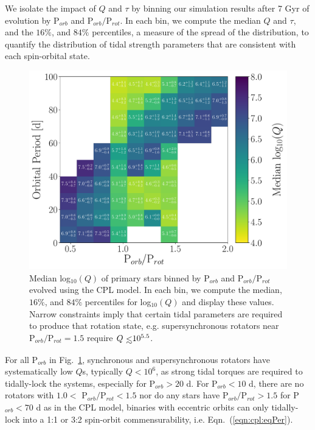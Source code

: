 \documentclass[twocolumn]{aastex61}
\def\lsim{~\rlap{$<$}{\lower 1.0ex\hbox{$\sim$}}}
\begin{document}
We isolate the impact of $Q$ and $\tau$ by binning our simulation results after 7 Gyr of evolution by P$_{orb}$ and P$_{orb}/$P$_{rot}$.  In each bin, we compute the median $Q$ and $\tau$, and the $16\%$, and $84\%$ percentiles, a measure of the spread of the distribution, to quantify the distribution of tidal strength parameters that are consistent with each spin-orbital state.  

\begin{figure}
	\includegraphics[width=\textwidth]{../Plots/porbProtPorbQHist.pdf}
   \caption{Median log$_{10}(Q)$ of primary stars binned by P$_{orb}$ and P$_{orb}/$P$_{rot}$ evolved using the CPL model.  In each bin, we compute the median, $16\%$, and $84\%$ percentiles for log$_{10}(Q)$ and display these values. Narrow constraints imply that certain tidal parameters are required to produce that rotation state, e.g. supersynchronous rotators near P$_{orb}/$P$_{rot} = 1.5$ require $Q \lsim 10^{5.5}$. }%
    \label{fig:qmap}%
\end{figure}

For all P$_{orb}$ in Fig.~\ref{fig:qmap}, synchronous and supersynchronous rotators have systematically low $Q$s, typically $Q < 10^6$, as strong tidal torques are required to tidally-lock the systems, especially for P$_{orb} > 20$ d. For P$_{orb} < 10$ d, there are no rotators with $1.0 <$ P$_{orb}/$P$_{rot} < 1.5$ nor do any stars have P$_{orb}/$P$_{rot} > 1.5$ for P$_{orb} < 70$ d as in the CPL model, binaries with eccentric orbits can only tidally-lock into a 1:1 or 3:2 spin-orbit commensurability, i.e. Eqn.~(\ref{eqn:cpl:eqPer}).   
\end{document}

